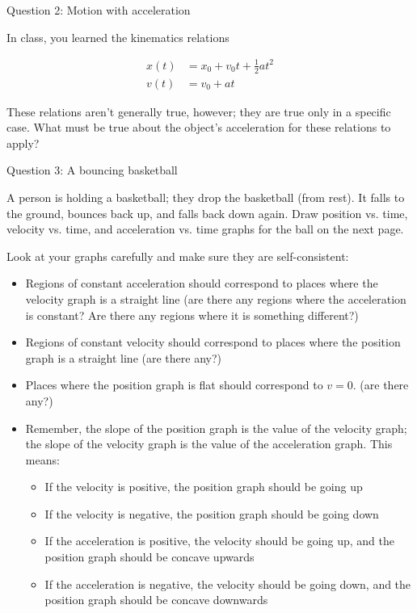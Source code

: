\documentclass[12pt]{article}
\newcommand{\BI}{\begin{itemize}}
\newcommand{\EI}{\end{itemize}}
\def\BS{\bigskip}
\begin{document}
\vspace{3in}
\newpage
\centerline{\Large Question 2: Motion with acceleration}

In class, you learned the kinematics relations

\begin{align*}
x(t) &= x_0 + v_0t + \frac{1}{2}at^2 \\
v(t) &= v_0 + at
\end{align*}

These relations aren't generally true, however; they are true only in a specific case. What must be true about the object's acceleration for these relations to apply?

\vspace{1.2in}
\newpage



\centerline{\Large Question 3: A bouncing basketball}

\BS

A person is holding a basketball; they drop the basketball (from rest). It falls to the ground, bounces back up, and falls back down again. Draw position vs. time, velocity vs. time, and acceleration vs. time graphs for the ball on the next page.

Look at your graphs carefully and make sure they are self-consistent:


\BI
    \item Regions of constant acceleration should correspond to places where the velocity graph is a straight line (are there any regions where the acceleration is constant? Are there any regions where it is something different?)
    \item Regions of constant velocity should correspond to places where the position graph is a straight line (are there any?)
    \item Places where the position graph is flat should correspond to $v=0$. (are there any?)
    \item Remember, the slope of the position graph is the value of the velocity graph; the slope of the velocity graph is the value of the acceleration graph. This means:
    \begin{itemize}
    	\item If the velocity is positive, the position graph should be going up
    	\item If the velocity is negative, the position graph should be going down
    	\item If the acceleration is positive, the velocity should be going up, and the position graph should be concave upwards
    	\item If the acceleration is negative, the velocity should be going down, and the position graph should be concave downwards
    \end{itemize}
\EI
     
\end{document}
